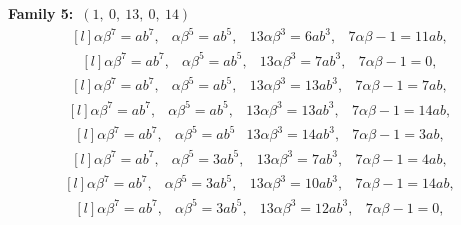 \documentclass[12pt,a4wide, reqno]{amsart}
\theoremstyle{definition}
\theoremstyle{remark}
\numberwithin{equation}{section}
\begin{document}
    \textbf{Family 5:}~$(1,~0,~13,~0,~14)$ 
\begin{equation}\label{eq70}
    \begin{matrix*}[l]
         \alpha \beta ^7=ab^7, & \alpha \beta ^5=ab^5, & 13\alpha \beta ^3=6ab ^3, & 7\alpha\beta-1=11ab,
    \end{matrix*}
\end{equation}
\begin{equation}\label{eq71}
    \begin{matrix*}[l]
          \alpha \beta ^7=ab^7, & \alpha \beta ^5=ab^5, & 13\alpha \beta ^3=7ab ^3, & 7\alpha\beta-1=0,
    \end{matrix*}
\end{equation}
\begin{equation}\label{eq72}
    \begin{matrix*}[l]
          \alpha \beta ^7=ab^7, & \alpha \beta ^5=ab^5, & 13\alpha \beta ^3=13ab ^3, & 7\alpha\beta-1=7ab,
    \end{matrix*}
\end{equation}
\begin{equation}\label{eq73}
    \begin{matrix*}[l]
          \alpha \beta ^7=ab^7, & \alpha \beta ^5=ab^5, & 13\alpha \beta ^3=13ab^3, & 7\alpha\beta-1=14ab,
    \end{matrix*}
\end{equation}
\begin{equation}\label{eq74}
    \begin{matrix*}[l]
          \alpha \beta ^7=ab^7, & \alpha \beta ^5=ab^5 & 13\alpha \beta ^3=14ab ^3, & 7\alpha\beta-1=3ab,
    \end{matrix*}
\end{equation}
\begin{equation}\label{eq75}
    \begin{matrix*}[l]
          \alpha \beta ^7=ab^7, & \alpha \beta ^5=3ab^5, & 13\alpha \beta ^3=7ab^3, & 7\alpha\beta-1=4ab,
    \end{matrix*}
\end{equation}
\begin{equation}\label{eq76}
    \begin{matrix*}[l]
          \alpha \beta ^7=ab^7, & \alpha \beta ^5=3ab^5, & 13\alpha \beta ^3=10ab ^3, & 7\alpha\beta-1=14ab,
    \end{matrix*}
\end{equation}
\begin{equation}\label{eq77}
    \begin{matrix*}[l]
          \alpha \beta ^7=ab^7, & \alpha \beta ^5=3ab^5, & 13\alpha \beta ^3=12ab ^3, & 7\alpha\beta-1=0,
    \end{matrix*}
\end{equation}
\end{document}
